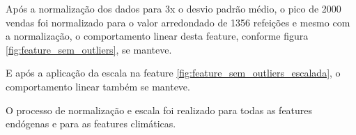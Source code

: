 \documentclass[	12pt, Times, openright, twoside, a4paper, english, brazil]{abntex2}
\begin{document}
                    Após a normalização dos dados para 3x o desvio padrão médio, o pico de 2000 vendas foi normalizado para o valor arredondado de 1356 refeições e mesmo com a normalização, o comportamento linear desta feature, conforme figura \ref{fig:feature_sem_outliers}, se manteve.
                    \begin{figure}[H]
                    \end{figure}
                    E após a aplicação da escala na feature \ref{fig:feature_sem_outliers_escalada}, o comportamento linear também se manteve.
                    \begin{figure}[H]
                    \end{figure}
                    
                    O processo de normalização e escala foi realizado para todas as features endógenas e para as features climáticas.
                    
\end{document}
